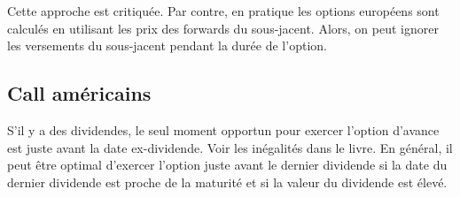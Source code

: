 Cette approche est critiquée. Par contre, en pratique les options européens sont calculés en utilisant les prix des forwards du sous-jacent. Alors, on peut ignorer les versements du sous-jacent pendant la durée de l'option. 

\subsection{Call américains}

S'il y a des dividendes, le seul moment opportun pour exercer l'option d'avance est juste avant la date ex-dividende. Voir les inégalités dans le livre. En général, il peut être optimal d'exercer l'option juste avant le dernier dividende si la date du dernier dividende est proche de la maturité et si la valeur du dividende est élevé. 

